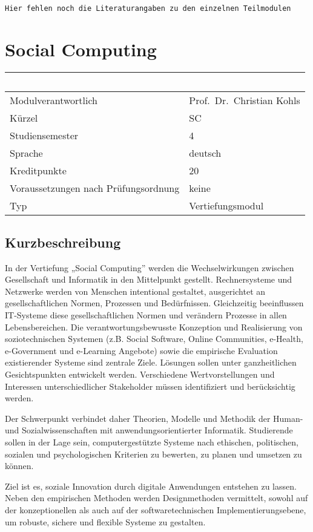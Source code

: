 \begin{verbatim}

Hier fehlen noch die Literaturangaben zu den einzelnen Teilmodulen
\end{verbatim}

\chapter{Social Computing}\label{social-computing}

\begin{longtable}[]{@{}ll@{}}
\toprule
~ & ~\tabularnewline
\midrule
\endhead
Modulverantwortlich & Prof.~Dr.~Christian Kohls\tabularnewline
Kürzel & SC\tabularnewline
Studiensemester & 4\tabularnewline
Sprache & deutsch\tabularnewline
Kreditpunkte & 20\tabularnewline
Voraussetzungen nach Prüfungsordnung & keine\tabularnewline
Typ & Vertiefungsmodul\tabularnewline
\bottomrule
\end{longtable}

\section*{Kurzbeschreibung}\label{kurzbeschreibung-6}

In der Vertiefung „Social Computing'' werden die Wechselwirkungen
zwischen Gesellschaft und Informatik in den Mittelpunkt gestellt.
Rechnersysteme und Netzwerke werden von Menschen intentional gestaltet,
ausgerichtet an gesellschaftlichen Normen, Prozessen und Bedürfnissen.
Gleichzeitig beeinflussen IT-Systeme diese gesellschaftlichen Normen und
verändern Prozesse in allen Lebensbereichen. Die verantwortungsbewusste
Konzeption und Realisierung von soziotechnischen Systemen (z.B. Social
Software, Online Communities, e-Health, e-Government und e-Learning
Angebote) sowie die empirische Evaluation existierender Systeme sind
zentrale Ziele. Lösungen sollen unter ganzheitlichen Gesichtspunkten
entwickelt werden. Verschiedene Wertvorstellungen und Interessen
unterschiedlicher Stakeholder müssen identifiziert und berücksichtig
werden.

Der Schwerpunkt verbindet daher Theorien, Modelle und Methodik der
Human- und Sozialwissenschaften mit anwendungsorientierter Informatik.
Studierende sollen in der Lage sein, computergestützte Systeme nach
ethischen, politischen, sozialen und psychologischen Kriterien zu
bewerten, zu planen und umsetzen zu können.

Ziel ist es, soziale Innovation durch digitale Anwendungen entstehen zu
lassen. Neben den empirischen Methoden werden Designmethoden vermittelt,
sowohl auf der konzeptionellen als auch auf der softwaretechnischen
Implementierungsebene, um robuste, sichere und flexible Systeme zu
gestalten.

